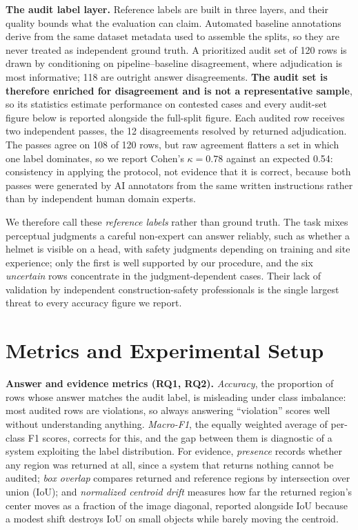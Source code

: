 \documentclass[12pt,letterpaper]{article}
\begin{document}
\textbf{The audit label layer.} Reference labels are built in three layers, and their quality bounds what the evaluation can claim. Automated baseline annotations derive from the same dataset metadata used to assemble the splits, so they are never treated as independent ground truth. A prioritized audit set of 120 rows is drawn by conditioning on pipeline--baseline disagreement, where adjudication is most informative; 118 are outright answer disagreements. \textbf{The audit set is therefore enriched for disagreement and is not a representative sample}, so its statistics estimate performance on contested cases and every audit-set figure below is reported alongside the full-split figure. Each audited row receives two independent passes, the 12 disagreements resolved by returned adjudication. The passes agree on 108 of 120 rows, but raw agreement flatters a set in which one label dominates, so we report Cohen's $\kappa = 0.78$ against an expected 0.54: consistency in applying the protocol, not evidence that it is correct, because both passes were generated by AI annotators from the same written instructions rather than by independent human domain experts.

We therefore call these \textit{reference labels} rather than ground truth. The task mixes perceptual judgments a careful non-expert can answer reliably, such as whether a helmet is visible on a head, with safety judgments depending on training and site experience; only the first is well supported by our procedure, and the six \textit{uncertain} rows concentrate in the judgment-dependent cases. Their lack of validation by independent construction-safety professionals is the single largest threat to every accuracy figure we report.

\section{Metrics and Experimental Setup}

\textbf{Answer and evidence metrics (RQ1, RQ2).} \textit{Accuracy}, the proportion of rows whose answer matches the audit label, is misleading under class imbalance: most audited rows are violations, so always answering ``violation'' scores well without understanding anything. \textit{Macro-F1}, the equally weighted average of per-class F1 scores, corrects for this, and the gap between them is diagnostic of a system exploiting the label distribution. For evidence, \textit{presence} records whether any region was returned at all, since a system that returns nothing cannot be audited; \textit{box overlap} compares returned and reference regions by intersection over union (IoU); and \textit{normalized centroid drift} measures how far the returned region's center moves as a fraction of the image diagonal, reported alongside IoU because a modest shift destroys IoU on small objects while barely moving the centroid.
\end{document}
